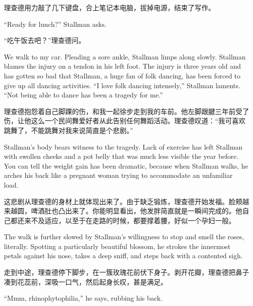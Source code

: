 \ifdefined\chs
理查德用力敲了几下键盘，合上笔记本电脑，拔掉电源，结束了写作。
\fi

\ifdefined\eng
``Ready for lunch?'' Stallman asks.
\fi

\ifdefined\chs
“吃午饭去吧？”理查德问。
\fi

\ifdefined\eng
We walk to my car. Pleading a sore ankle, Stallman limps along slowly. Stallman blames the injury on a tendon in his left foot. The injury is three years old and has gotten so bad that Stallman, a huge fan of folk dancing, has been forced to give up all dancing activities. ``I love folk dancing intensely,'' Stallman laments. ``Not being able to dance has been a tragedy for me.''
\fi

\ifdefined\chs
理查德抱怨着自己脚踝的伤，和我一起徐步走到我的车前。他左脚跟腱三年前受了伤，让他这么一个民间舞爱好者从此告别任何舞蹈活动。理查德叹道：“我可喜欢跳舞了，不能跳舞对我来说简直是个悲剧。”
\fi

\ifdefined\eng
Stallman's body bears witness to the tragedy. Lack of exercise has left Stallman with swollen cheeks and a pot belly that was much less visible the year before. You can tell the weight gain has been dramatic, because when Stallman walks, he arches his back like a pregnant woman trying to accommodate an unfamiliar load.
\fi

\ifdefined\chs
这悲剧从理查德的身材上就体现出来了。由于缺乏锻炼，理查德开始发福。脸颊越来越圆，啤酒肚也凸出来了。你能明显看出，他发胖简直就是一瞬间完成的。他自己都还来不及适应，以至于在走路的时候，都要撑着腰，好似一个孕妇一般。
\fi

\ifdefined\eng
The walk is further slowed by Stallman's willingness to stop and smell the roses, literally. Spotting a particularly beautiful blossom, he strokes the innermost petals against his nose, takes a deep sniff, and steps back with a contented sigh.
\fi

\ifdefined\chs
走到中途，理查德停下脚步，在一簇玫瑰花前伏下身子。剥开花瓣，理查德把鼻子凑到花蕊前，深吸一口气，然后起身长叹，甚是满足。
\fi

\ifdefined\eng
``Mmm, rhinophytophilia,'' he says, rubbing his back.
\fi

